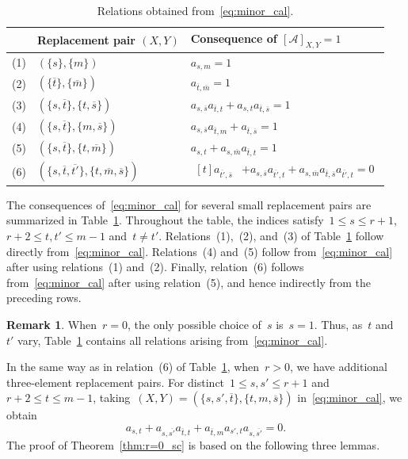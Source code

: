 \documentclass[11pt]{amsart}
\theoremstyle{plain}
\numberwithin{equation}{section}
\theoremstyle{definition}
\newtheorem{remark}[theorem]{Remark}
\newcommand{\cA}{\mathcal{A}}
\begin{document}
\begin{table}
    \centering
    \begin{tabular}{c p{} p{}}
        \hline
         & Replacement pair $(X,Y)$ & Consequence of $[\cA]_{X,Y}=1$ \\ \hline
        (1) & $(\{s\},\{m\})$ &$a_{s,m}=1$ \\
        (2) & $(\{\overline{t}\},\{\overline{m}\})$ & $a_{\overline{t},\overline{m}}=1$ \\
        (3) & $(\{s,\overline{t}\},\{t,\overline{s}\})$ & $a_{s,\overline{s}}a_{\overline{t},t}+a_{s,t}a_{\overline{t},\overline{s}}=1$ \\
        (4) & $(\{s,\overline{t}\},\{m,\overline{s}\})$ & $a_{s,\overline{s}}a_{\overline{t},m}+a_{\overline{t},\overline{s}}=1$ \\
        (5) & $(\{s,\overline{t}\},\{t,\overline{m}\})$ & $a_{s,t}+a_{s,\overline{m}}a_{\overline{t},t}=1$ \\
        (6) & $(\{s,\overline{t},\overline{t'}\}, \{t,\overline{m},\overline{s}\})$ & $\begin{aligned}[t] a_{\overline{t'},\overline{s}} &+a_{s,\overline{s}}a_{\overline{t'},t}+a_{s,\overline{m}}a_{\overline{t},\overline{s}}a_{\overline{t'},t}=0 \end{aligned}$ \\ \hline
    \end{tabular}
    \caption{Relations obtained from~\eqref{eq:minor_cal}.} \label{tab:minor-cal-relations}
\end{table}

The consequences of~\eqref{eq:minor_cal} for several small replacement pairs are summarized in Table~\ref{tab:minor-cal-relations}.
Throughout the table, the indices satisfy~$1\leq s\leq r+1$, $r+2\leq t, t'\leq m-1$ and~$t \neq t'$.
Relations~(1),~(2), and~(3) of Table~\ref{tab:minor-cal-relations} follow directly from~\eqref{eq:minor_cal}.
Relations~(4) and~(5) follow from~\eqref{eq:minor_cal} after using relations~(1) and~(2).
Finally, relation~(6) follows from~\eqref{eq:minor_cal} after using relation~(5), and hence indirectly from the preceding rows.

\begin{remark}
    When~$r=0$, the only possible choice of~$s$ is~$s=1$. 
    Thus, as~$t$ and~$t'$ vary, Table~\ref{tab:minor-cal-relations} contains all relations arising from~\eqref{eq:minor_cal}.
\end{remark}

In the same way as in relation~(6) of Table~\ref{tab:minor-cal-relations}, when~$r>0$, we have additional three-element replacement pairs.
For distinct~$1\leq s,s'\leq r+1$ and~$r+2\leq t\leq m-1$, taking~$(X,Y)=(\{s,s',\overline{t}\}, \{t,m,\overline{s}\})$ in~\eqref{eq:minor_cal}, we obtain
\begin{equation}\label{eq:minor-3b}
    a_{s,t} +a_{s,\overline{s'}}a_{\overline{t},t} +a_{\overline{t},m}a_{s',t}a_{s,\overline{s'}} = 0.
\end{equation}
The proof of Theorem~\ref{thm:r=0_sc} is based on the following three lemmas.
\end{document}
